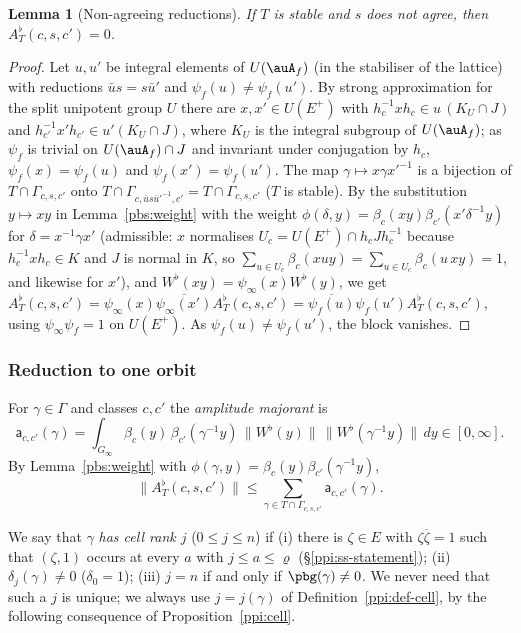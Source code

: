 \documentclass[10pt]{amsart}
\newtheorem{lemma}[theorem]{Lemma}
\theoremstyle{definition}
\theoremstyle{remark}
\providecommand{\aubar}[1]{\overline{#1}}
\begin{document}
\begin{lemma}[Non-agreeing reductions]\label{pbs:agree}
If $T$ is stable and $s$ does not agree, then $A^\flat_T(c,s,c')=0$.
\end{lemma}
\begin{proof}
Let $u,u'$ be integral elements of $U(\auA_f)$ (in the stabiliser of the lattice) with reductions
$\bar u s=s\bar u'$ and $\psi_f(u)\ne\psi_f(u')$. By strong approximation for the split unipotent
group $U$ there are $x,x'\in U(E^+)$ with $h_c^{-1}xh_c\in u\,(K_U\cap J)$ and $h_{c'}^{-1}x'h_{c'}\in
u'(K_U\cap J)$, where $K_U$ is the integral subgroup of $U(\auA_f)$; as $\psi_f$ is trivial on $U(\auA_f)
\cap J$ and invariant under conjugation by $h_c$, $\psi_f(x)=\psi_f(u)$ and $\psi_f(x')=\psi_f(u')$.
The map $\gamma\mapsto x\gamma x'^{-1}$ is a bijection of $T\cap\Gamma_{c,s,c'}$ onto $T\cap\Gamma_{c,
\bar us\bar u'^{-1},c'}=T\cap\Gamma_{c,s,c'}$ ($T$ is stable). By the substitution $y\mapsto xy$ in
Lemma~\ref{pbs:weight} with the weight $\phi(\delta,y)=\beta_c(xy)\beta_{c'}(x'\delta^{-1}
y)$ for $\delta=x^{-1}\gamma x'$ (admissible: $x$ normalises $U_c=U(E^+)\cap h_cJh_c^{-1}$ because
$h_c^{-1}xh_c\in K$ and $J$ is normal in $K$, so $\sum_{u\in U_c}\beta_c(xuy)=\sum_{u\in U_c}\beta_c(u\,
xy)=1$, and likewise for $x'$), and $W^\flat(xy)=\psi_\infty(x)W^\flat(y)$,
we get $A^\flat_T(c,s,c')=\psi_\infty(x)\aubar{\psi_\infty(x')}A^\flat_T(c,s,c')=\aubar{\psi_f(u)}
\psi_f(u')A^\flat_T(c,s,c')$, using $\psi_\infty\psi_f=1$ on $U(E^+)$. As $\psi_f(u)\ne\psi_f(u')$, the
block vanishes.
\end{proof}

\subsubsection{Reduction to one orbit}\label{pbs:ss-reduction}

For $\gamma\in\Gamma$ and classes $c,c'$ the \emph{amplitude majorant} is
\[
\mathsf a_{c,c'}(\gamma)=\int_{G_\infty}\beta_c(y)\,\beta_{c'}(\gamma^{-1}y)\,\|W^\flat(y)\|\,
\|W^\flat(\gamma^{-1}y)\|\,dy\in[0,\infty].
\]
By Lemma~\ref{pbs:weight} with $\phi(\gamma,y)=\beta_c(y)\beta_{c'}(\gamma^{-1}y)$,
\begin{equation}\label{pbs:eq-majorant}
\|A^\flat_T(c,s,c')\|\le\sum_{\gamma\in T\cap\Gamma_{c,s,c'}}\mathsf a_{c,c'}(\gamma).
\end{equation}

We say that $\gamma$ \emph{has cell rank $j$} ($0\le j\le n$) if (i) there is $\zeta\in E$ with
$\zeta\aubar\zeta=1$ such that $(\zeta,1)$ occurs at every $a$ with $j\le a\le\varrho$
(\S\ref{ppi:ss-statement}); (ii) $\delta_j(\gamma)\ne0$ ($\delta_0=1$); (iii) $j=n$ if and only if
$\pbg(\gamma)\ne0$. We never need that such a $j$ is unique; we always use $j=j(\gamma)$ of
Definition~\ref{ppi:def-cell}, by the following consequence of Proposition~\ref{ppi:cell}.
\end{document}
